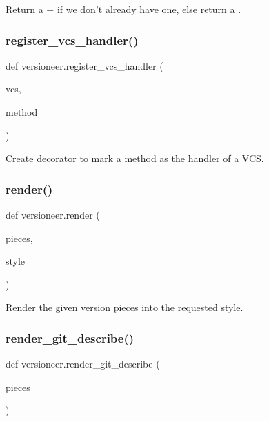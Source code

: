 \begin{DoxyVerb}Return a + if we don't already have one, else return a .\end{DoxyVerb}
 \mbox{\label{namespaceversioneer_a5573fabc5582faade41a6365347777aa}} 
\subsubsection{\texorpdfstring{register\+\_\+vcs\+\_\+handler()}{register\_vcs\_handler()}}
{\footnotesize\ttfamily def versioneer.\+register\+\_\+vcs\+\_\+handler (\begin{DoxyParamCaption}\item[{}]{vcs,  }\item[{}]{method }\end{DoxyParamCaption})}

\begin{DoxyVerb}Create decorator to mark a method as the handler of a VCS.\end{DoxyVerb}
 \mbox{\label{namespaceversioneer_a597f5f4b8e0048fcff33a55857631520}} 
\subsubsection{\texorpdfstring{render()}{render()}}
{\footnotesize\ttfamily def versioneer.\+render (\begin{DoxyParamCaption}\item[{}]{pieces,  }\item[{}]{style }\end{DoxyParamCaption})}

\begin{DoxyVerb}Render the given version pieces into the requested style.\end{DoxyVerb}
 \mbox{\label{namespaceversioneer_aec71e41845cbfe2d55fb138d90b17440}} 
\subsubsection{\texorpdfstring{render\+\_\+git\+\_\+describe()}{render\_git\_describe()}}
{\footnotesize\ttfamily def versioneer.\+render\+\_\+git\+\_\+describe (\begin{DoxyParamCaption}\item[{}]{pieces }\end{DoxyParamCaption})}

